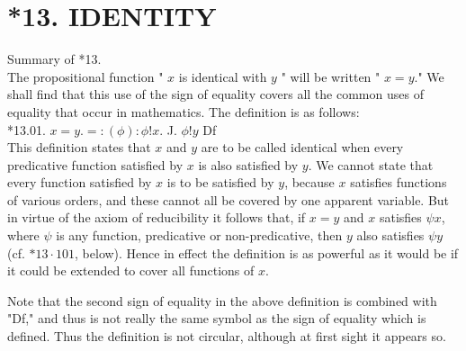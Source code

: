 \documentclass[10pt]{article}
\begin{document}
\section*{*13. IDENTITY}
Summary of *13.\\
The propositional function " $x$ is identical with $y$ " will be written " $x=y$." We shall find that this use of the sign of equality covers all the common uses of equality that occur in mathematics. The definition is as follows:\\
*13.01. $x=y .=:(\phi): \phi!x$. J. $\phi!y$ Df\\
This definition states that $x$ and $y$ are to be called identical when every predicative function satisfied by $x$ is also satisfied by $y$. We cannot state that every function satisfied by $x$ is to be satisfied by $y$, because $x$ satisfies functions of various orders, and these cannot all be covered by one apparent variable. But in virtue of the axiom of reducibility it follows that, if $x=y$ and $x$ satisfies $\psi x$, where $\psi$ is any function, predicative or non-predicative, then $y$ also satisfies $\psi y$ (cf. $* 13 \cdot 101$, below). Hence in effect the definition is as powerful as it would be if it could be extended to cover all functions of $x$.

Note that the second sign of equality in the above definition is combined with "Df," and thus is not really the same symbol as the sign of equality which is defined. Thus the definition is not circular, although at first sight it appears so.
\end{document}
